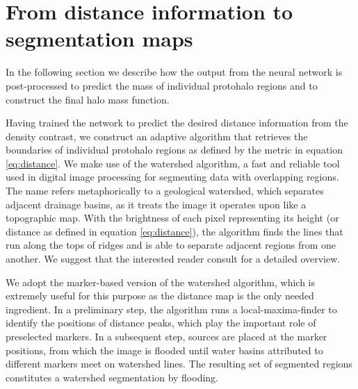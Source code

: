 \documentclass[fleqn,usenatbib]{mnras}
\begin{document}
\section{From distance information to segmentation maps}
\label{sec:dist_to_seg}
In the following section we describe how the output from the neural network is post-processed to predict the mass of individual protohalo regions and to construct the final halo mass function.\par
Having trained the network to predict the desired distance information from the density contrast, we construct an adaptive algorithm that retrieves the boundaries of individual protohalo regions as defined by the metric in equation \ref{eq:distance}.
We make use of the watershed algorithm, a fast and reliable tool used in digital image processing for segmenting data with overlapping regions. The name refers metaphorically to a geological watershed, which separates adjacent drainage basins, as it treats the image it operates upon like a topographic map. With the brightness of each pixel representing its height (or distance as defined in equation \ref{eq:distance}), the algorithm finds the lines that run along the tops of ridges and is able to separate adjacent regions from one another. We suggest that the interested reader consult \cite{Kornilov2018} for a detailed overview. \par
We adopt the marker-based version of the watershed algorithm, which is extremely useful for this purpose as the distance map is the only needed ingredient.
In a preliminary step, the algorithm runs a local-maxima-finder to identify the positions of distance peaks, which play the important role of preselected markers. In a subsequent step, sources are placed at the marker positions, from which the image is flooded until water basins attributed to different markers meet on watershed lines. The resulting set of segmented regions constitutes a watershed segmentation by flooding.\\
\end{document}
